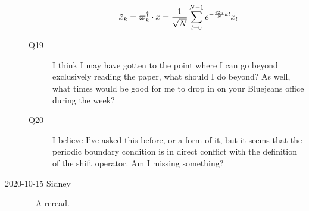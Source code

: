 \begin{description}
\begin{description}
$$\tilde{x}_k=\varpi^{\dagger}_k\cdot x=\frac{1}{\sqrt{N}}\sum^{N-1}_{l=0}e^{-\frac{i2\pi}{N}kl}x_l$$

\item[Q19]
I think I may have gotten to the point where I can go beyond exclusively reading the paper, what should I do beyond? As well, what times would be good for me to drop in on your Bluejeans office during the week?

\item[Q20]
I believe I've asked this before, or a form of it, but it seems that the periodic boundary condition is in direct conflict with the definition of the shift operator. Am I missing something?
\end{description}

\item[2020-10-15 Sidney]~ A reread.


\end{description}
